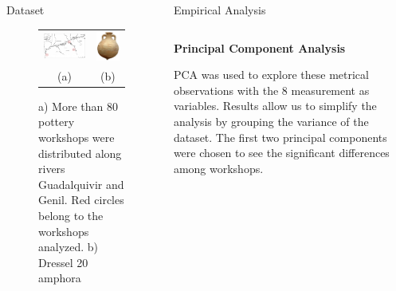 \documentclass[final]{beamer}
\newlength{\onecolwid}
\newlength{\twocolwid}
\begin{document}
\begin{frame}[t]
\begin{columns}[t]
\begin{column}{\onecolwid}
\begin{block}{Dataset}
\begin{figure}
\begin{tabular}{cc}


\includegraphics[width=0.7\linewidth]{images/fig1.png} &
\includegraphics[width=0.2\linewidth]{images/amphorae.png} \\
(a) & (b)
\end{tabular}

\singlespace
\caption{a) More than 80 pottery workshops were distributed along rivers Guadalquivir and Genil. Red circles belong to the workshops analyzed. b) Dressel 20 amphora}
\label{fig:betica}
\end{figure}


 \end{block}
\end{column} %

\begin{column}{\twocolwid}


\begin{block}{Empirical Analysis}
\begin{columns}[t,totalwidth=\twocolwid]



\begin{column}{\onecolwid} %


{\textbf{Principal Component Analysis}} 
\justify

PCA was used to explore these metrical observations with the 8 measurement as variables. Results allow us to simplify the analysis by grouping the variance of the dataset. The first two principal components were chosen to see the significant differences among workshops. 


\end{column}
\end{columns}
\end{block}
\end{column}
\end{columns}
\end{frame}
\end{document}
